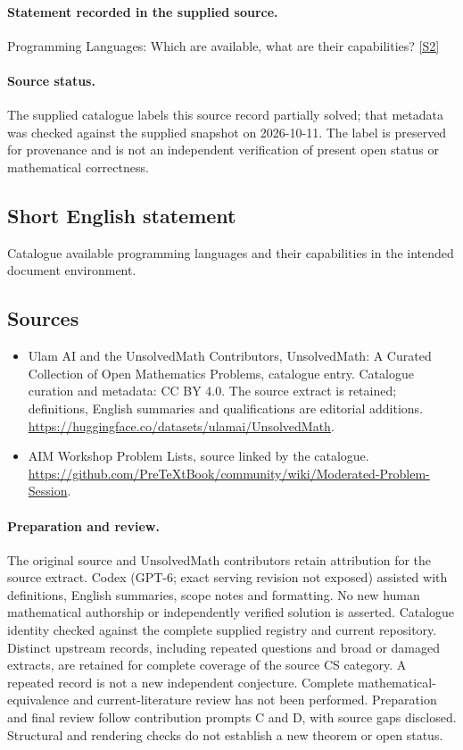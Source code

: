 \documentclass[11pt]{article}
\begin{document}
\paragraph{Statement recorded in the supplied source.}
Programming Languages: Which are available, what are their capabilities? \href{https://github.com/PreTeXtBook/community/wiki/Moderated-Problem-Session}{[S2]}
\paragraph{Source status.}
The supplied catalogue labels this source record partially solved; that metadata was checked against the supplied snapshot on 2026-10-11. The label is preserved for provenance and is not an independent verification of present open status or mathematical correctness.
\subsection{Short English statement}
Catalogue available programming languages and their capabilities in the intended document environment.
\subsection{Sources}
\begin{itemize}
\item[S1] Ulam AI and the UnsolvedMath Contributors, UnsolvedMath: A Curated Collection of Open Mathematics Problems, catalogue entry. Catalogue curation and metadata: CC BY 4.0. The source extract is retained; definitions, English summaries and qualifications are editorial additions.
\url{https://huggingface.co/datasets/ulamai/UnsolvedMath}.
\item[S2] AIM Workshop Problem Lists, source linked by the catalogue.
\url{https://github.com/PreTeXtBook/community/wiki/Moderated-Problem-Session}.
\end{itemize}
\paragraph{Preparation and review.}
The original source and UnsolvedMath contributors retain attribution for the source extract. Codex (GPT-6; exact serving revision not exposed) assisted with definitions, English summaries, scope notes and formatting. No new human mathematical authorship or independently verified solution is asserted. Catalogue identity checked against the complete supplied registry and current repository. Distinct upstream records, including repeated questions and broad or damaged extracts, are retained for complete coverage of the source CS category. A repeated record is not a new independent conjecture. Complete mathematical-equivalence and current-literature review has not been performed. Preparation and final review follow contribution prompts C and D, with source gaps disclosed. Structural and rendering checks do not establish a new theorem or open status.
\label{end:statement}
\end{document}
